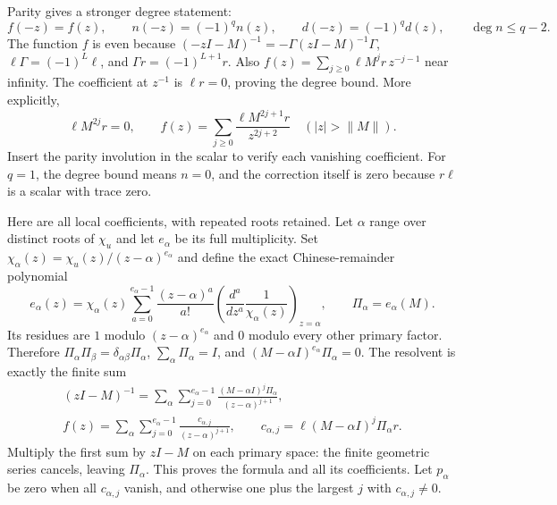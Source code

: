 Parity gives a stronger degree statement:
\begin{equation}\tag{NS12}\label{sfsec:NS12}
f(-z)=f(z),\qquad
n(-z)=(-1)^qn(z),\qquad
d(-z)=(-1)^qd(z),\qquad
\deg n\leq q-2 .
\end{equation}
The function $f$ is even because
$(-zI-M)^{-1}=-\Gamma(zI-M)^{-1}\Gamma$,
$\ell\Gamma=(-1)^L\ell$, and $\Gamma r=(-1)^{L+1}r$.
Also
$f(z)=\sum_{j\geq0}\ell M^jr\,z^{-j-1}$ near infinity.
The coefficient at $z^{-1}$ is $\ell r=0$, proving the degree
bound. More explicitly,
\begin{equation}\tag{NS13}\label{sfsec:NS13}
\ell M^{2j}r=0,\qquad
f(z)=\sum_{j\geq0}\frac{\ell M^{2j+1}r}{z^{2j+2}}
\quad(|z|>\|M\|).
\end{equation}
Insert the parity involution in the scalar to verify each
vanishing coefficient. For $q=1$, the degree bound means
$n=0$, and the correction itself is zero because $r\ell$
is a scalar with trace zero.

Here are all local coefficients, with repeated roots retained.
Let $\alpha$ range over distinct roots of $\chi_u$ and let
$e_\alpha$ be its full multiplicity. Set
$\chi_{\alpha}(z)=\chi_u(z)/(z-\alpha)^{e_\alpha}$ and define
the exact Chinese-remainder polynomial
\begin{equation}\tag{NS14}\label{sfsec:NS14}
e_\alpha(z)=\chi_\alpha(z)
\sum_{a=0}^{e_\alpha-1}
\frac{(z-\alpha)^a}{a!}
\left(\frac{d^a}{dz^a}\frac1{\chi_\alpha(z)}\right)_{z=\alpha},
\qquad \Pi_\alpha=e_\alpha(M).
\end{equation}
Its residues are $1$ modulo $(z-\alpha)^{e_\alpha}$ and
$0$ modulo every other primary factor. Therefore
$\Pi_\alpha\Pi_\beta=\delta_{\alpha\beta}\Pi_\alpha$,
$\sum_\alpha\Pi_\alpha=I$, and
$(M-\alpha I)^{e_\alpha}\Pi_\alpha=0$.
The resolvent is exactly the finite sum
\begin{equation}\tag{NS15}\label{sfsec:NS15}
\begin{gathered}
(zI-M)^{-1}
 =\sum_\alpha\sum_{j=0}^{e_\alpha-1}
       \frac{(M-\alpha I)^j\Pi_\alpha}{(z-\alpha)^{j+1}},\\
f(z)=\sum_\alpha\sum_{j=0}^{e_\alpha-1}
       \frac{c_{\alpha,j}}{(z-\alpha)^{j+1}},\qquad
c_{\alpha,j}=\ell(M-\alpha I)^j\Pi_\alpha r .
\end{gathered}
\end{equation}
Multiply the first sum by $zI-M$ on each primary space:
the finite geometric series cancels, leaving $\Pi_\alpha$.
This proves the formula and all its coefficients.
Let $p_\alpha$ be zero when all $c_{\alpha,j}$ vanish,
and otherwise one plus the largest $j$ with
$c_{\alpha,j}\ne0$.


